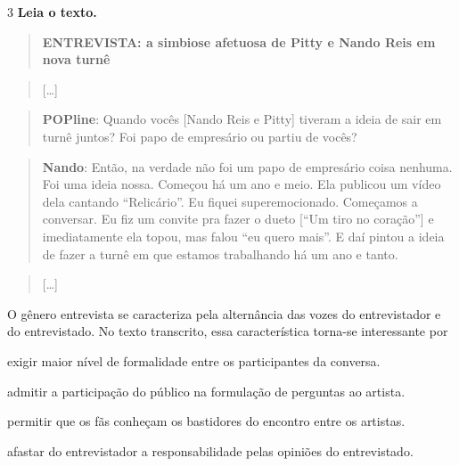 \num{3} \textbf{Leia o texto.}

\begin{quote}
\textbf{ENTREVISTA: a simbiose afetuosa de Pitty e Nando Reis em nova
turnê}
\end{quote}

\begin{quote}
{[}\ldots{]}
\end{quote}

\begin{quote}
\textbf{POPline}: Quando vocês {[}Nando Reis e Pitty{]} tiveram a ideia
de sair em turnê juntos? Foi papo de empresário ou partiu de vocês?
\end{quote}

\begin{quote}
\textbf{Nando}: Então, na verdade não foi um papo de empresário coisa
nenhuma. Foi uma ideia nossa. Começou há um ano e meio. Ela publicou um
vídeo dela cantando ``Relicário''. Eu fiquei superemocionado. Começamos
a conversar. Eu fiz um convite pra fazer o dueto {[}``Um tiro no
coração''{]} e imediatamente ela topou, mas falou ``eu quero mais''. E
daí pintou a ideia de fazer a turnê em que estamos trabalhando há um ano
e tanto.
\end{quote}

\begin{quote}
{[}\ldots{]}
\end{quote}


O gênero entrevista se caracteriza pela alternância das vozes do
entrevistador e do entrevistado. No texto transcrito, essa
característica torna-se interessante por

\begin{escolha}
\item exigir maior nível de formalidade entre os participantes da conversa.

\item admitir a participação do público na formulação de perguntas ao
artista.

\item permitir que os fãs conheçam os bastidores do encontro entre os
artistas.

\item afastar do entrevistador a responsabilidade pelas opiniões do
entrevistado.
\end{escolha}

